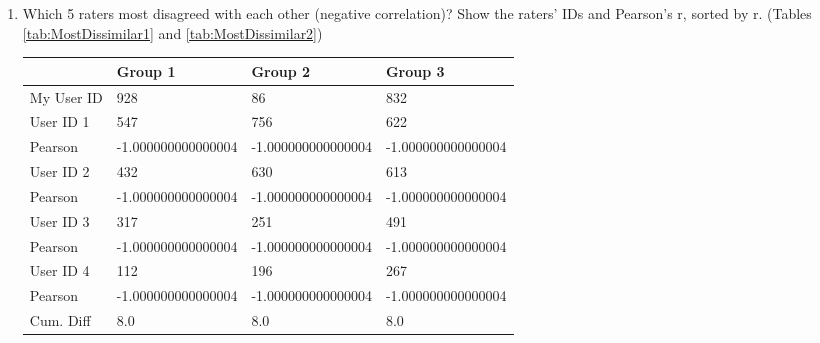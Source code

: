 \documentclass[letterpaper,11pt]{report}
\begin{document}
\begin{savenotes}
\begin{enumerate}
\item Which 5 raters most disagreed with each other (negative correlation)? Show the raters' IDs and Pearson's r, sorted by r. (Tables \ref{tab:MostDissimilar1} and \ref{tab:MostDissimilar2})

\begin{table*}[htbp]
\centering
\begin{tabular}{|l|l|l|l|}
\hline
    ~          & Group 1            & Group 2            & Group 3            \\ \hline
    My User ID & 928                & 86                & 832                \\ \hline
    User ID 1  & 547                & 756                & 622                \\ \hline
    Pearson    & -1.000000000000004 &-1.000000000000004  & -1.000000000000004  \\ \hline
    User ID 2  & 432                & 630                 & 613                \\ \hline
    Pearson    & -1.000000000000004 & -1.000000000000004  & -1.000000000000004  \\ \hline
    User ID 3  & 317                & 251                & 491                \\ \hline
    Pearson    & -1.000000000000004  & -1.000000000000004  & -1.000000000000004 \\ \hline
    User ID 4  & 112                & 196                & 267                \\ \hline
    Pearson    & -1.000000000000004  & -1.000000000000004  & -1.000000000000004 \\ \hline
    Cum. Diff  & 8.0 & 8.0 & 8.0 \\ \hline
\end{tabular}
\caption{Most Dissimilar Raters}
\label{tab:MostDissimilar1}
\end{table*}


\end{enumerate}
\end{savenotes}
\end{document}
